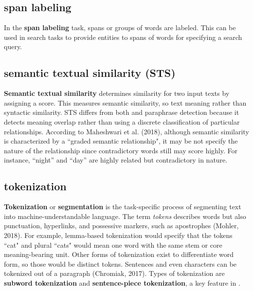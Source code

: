 \subsection{span labeling} \label{nlptask:spanlabeling}

In the \textbf{span labeling} task, spans or groups of words are labeled. This can be used in search tasks to provide entities to spans of words for specifying a search query. 

\subsection{semantic textual similarity (STS)} \label{nlptask:semantictextualsimilaritySTS}

\textbf{Semantic textual similarity} determines similarity for two input texts by assigning a score. This measures semantic similarity, so text meaning rather than syntactic similarity. STS differs from both  and paraphrase detection because it detects meaning overlap rather than using a discrete classification of particular relationships. According to Maheshwari et al. (2018), although semantic similarity is characterized by a ``graded semantic relationship", it may be not specify the nature of the relationship since contradictory words still may score highly. For instance, ``night” and ``day” are highly related but contradictory in nature. 



\subsection{tokenization} \label{nlptask:tokenization}

\textbf{Tokenization} or \textbf{segmentation} is the task-specific process of segmenting text into machine-understandable language. The term \emph{tokens} describes words but also punctuation, hyperlinks, and possessive markers, such as apostrophes (Mohler, 2018). For example, lemma-based tokenization would specify that the tokens ``cat" and plural ``cats" would mean one word with the same stem or core meaning-bearing unit. Other forms of tokenization exist to differentiate word form, so those would be distinct tokens. Sentences and even characters can be tokenized out of a paragraph (Chromiak, 2017). Types of tokenization are \textbf{subword tokenization} and \textbf{sentence-piece tokenization}, a key feature in . 



